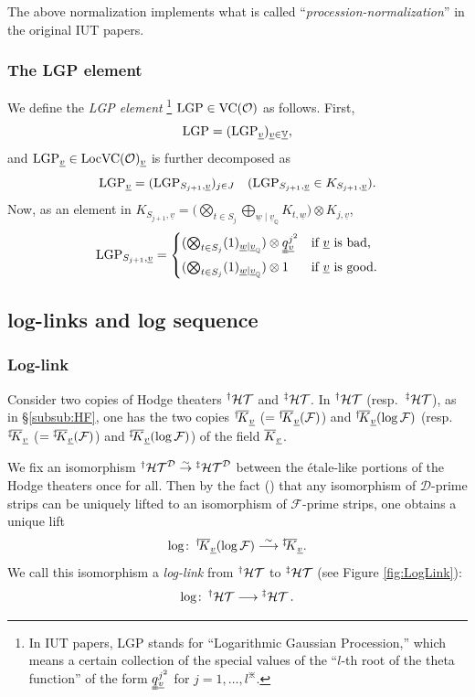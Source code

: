 \documentclass[12pt, reqno, a4paper]{amsart}
\def\udl#1{\underline{#1}} %
\def\longto{\longrightarrow}
\def\simto{\stackrel{\sim}{\rightarrow}} %
\def\simlongto{\stackrel{\sim}{\longrightarrow}} %
\def\bQ{\mathbb{Q}} %
\def\bV{\mathbb{V}}
\def\cD{{\mathcal{D}}}
\def\cF{{\mathcal{F}}}
\def\uV{\udl{\bV}} %
\def\uv{\udl{v}} %
\DeclareMathOperator{\VC}{VC}
\DeclareMathOperator{\LocVC}{LocVC}
\begin{document}
\begin{rem}
The above normalization implements what is called ``\emph{procession-normalization}'' in the original IUT papers.
\end{rem}


\subsubsection{The LGP element}\label{subsub:LGP}
We define the {\it LGP element} \footnote{In IUT papers, LGP stands for ``Logarithmic Gaussian Procession,'' which means a certain collection of the special values of the ``$l$-th root of the theta function'' of the form $\uuqq^{j^2}_{\uv}$ for $j=1,\ldots,l^{\divideontimes}$.} $\LGP\in\VC(\OO)$ as follows.
First, 
$$
\LGP=(\LGP_{\uv})_{\uv\in \uV},
$$
and $\LGP_{\uv}\in\LocVC(\OO)_{\uv}$ is further decomposed as
$$
\LGP_{\uv}=(\LGP_{S_{j+1},\uv})_{j\in J}\quad(\LGP_{S_{j+1},\uv}\in K_{S_{j+1},\uv}).
$$
Now, as an element in $K_{S_{j+1},\uv}=\bigl(\bigotimes_{t\in S_j}\bigoplus_{\underline{w}\mid \uv_\mathbb{Q}}K_{t,\underline{w}}\bigr)\otimes K_{j,\uv}$, 
$$
\LGP_{S_{j+1},\uv}=\begin{cases}
    (\bigotimes_{t\in S_j}(1)_{\udl{w}|\uv_{\bQ}})\otimes \uuqq^{j^2}_{\uv}&\text{if $\uv$ is bad,}\\
    (\bigotimes_{t\in S_j}(1)_{\udl{w}|\uv_{\bQ}})\otimes 1&\text{if $\uv$ is good.}
\end{cases}
$$


\subsection{log-links and log sequence}\label{sub:logLink}
\subsubsection{Log-link}\label{subsub:logLink}
Consider two copies of Hodge theaters $\HT[\dag]$ and $\HT[\ddag]$.
In $\HT[\dag]$ (resp.\ $\HT[\ddag]$), as in \S\ref{subsub:HF}, one has the two copies $\oK[\dag]_{\uv}$ ($=\oK[\dag]_{\uv}(\cF)$) and $\oK[\dag]_{\uv}(\log\cF)$ (resp.\ $\oK[\ddag]_{\uv}$ ($=\oK[\ddag]_{\uv}(\cF)$) and $\oK[\ddag]_{\uv}(\log\cF)$) of the field $\oK_{\uv}$.

We fix an isomorphism $\HT[\dag]^{\cD}\simto\HT[\ddag]^{\cD}$ between the \'etale-like portions of the Hodge theaters once for all. 
Then by the fact (\cite[Cor.\ 5.3 (ii), p.\ 160]{MR4225473}) that any isomorphism of $\cD$-prime strips can be uniquely lifted to an isomorphism of $\cF$-prime strips, one obtains a unique lift
$$
\log\colon\oK[\dag]_{\uv}(\log\cF)\simlongto\oK[\ddag]_{\uv}.
$$
We call this isomorphism a \emph{log-link} from $\HT[\dag]$ to $\HT[\ddag]$ (see Figure \ref{fig:LogLink}):
$$
\log\colon\HT[\dag]\longto\HT[\ddag].
$$
\end{document}
